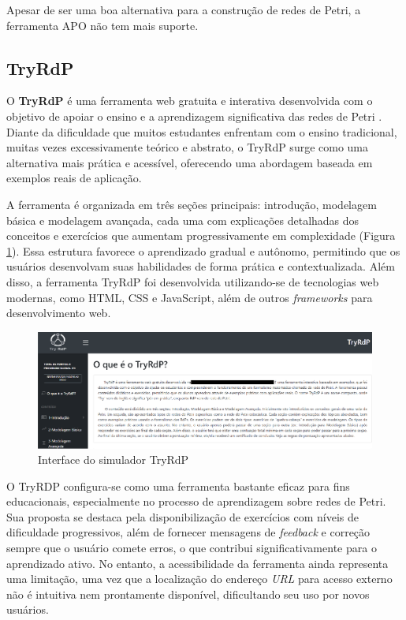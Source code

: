 \documentclass[
	12pt,				%
	openright,			%
	oneside,			%
	a4paper,			%
	english,			%
	brazil				%
	]{abntex2}
\theoremstyle{doispontos}
\begin{document}
Apesar de ser uma boa alternativa para a construção de redes de Petri, a ferramenta APO não tem mais suporte.  

\subsection{TryRdP}

O \textbf{TryRdP} é uma ferramenta web gratuita e interativa desenvolvida com o objetivo de apoiar o ensino e a aprendizagem significativa das redes de Petri \textcite{educomp}. Diante da dificuldade que muitos estudantes enfrentam com o ensino tradicional, muitas vezes excessivamente teórico e abstrato, o TryRdP surge como uma alternativa mais prática e acessível, oferecendo uma abordagem baseada em exemplos reais de aplicação. 

A ferramenta é organizada em três seções principais: introdução, modelagem básica e modelagem avançada, cada uma com explicações detalhadas dos conceitos e exercícios que aumentam progressivamente em complexidade (Figura \ref{fig:interfaceTryRdP}). Essa estrutura favorece o aprendizado gradual e autônomo, permitindo que os usuários desenvolvam suas habilidades de forma prática e contextualizada. Além disso, a ferramenta TryRdP foi desenvolvida utilizando-se de tecnologias web modernas, como HTML, CSS e JavaScript, além de outros \textit{frameworks} para desenvolvimento web.

\begin{figure}[ht] 
	\centering
	\includegraphics[scale=0.40]{figuras/tryrdpInterface.png}
	\caption[Interface do simulador TryRdP]{Interface do simulador TryRdP}
	\label{fig:interfaceTryRdP}
\end{figure}
\FloatBarrier

O TryRDP configura-se como uma ferramenta bastante eficaz para fins educacionais, especialmente no processo de aprendizagem sobre redes de Petri. Sua proposta se destaca pela disponibilização de exercícios com níveis de dificuldade progressivos, além de fornecer mensagens de \textit{feedback} e correção sempre que o usuário comete erros, o que contribui significativamente para o aprendizado ativo. No entanto, a acessibilidade da ferramenta ainda representa uma limitação, uma vez que a localização do endereço \textit{URL} para acesso externo não é intuitiva nem prontamente disponível, dificultando seu uso por novos usuários.
\end{document}
